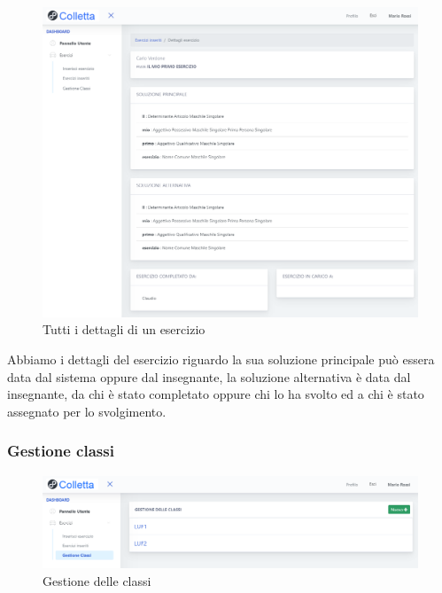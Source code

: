 \begin{figure}[H]
            	\centering
        		\includegraphics[width=17cm]{sez/img/insegnante/detagliesercizio.PNG} 
            	\caption{Tutti i dettagli di un esercizio}\label{fig:1}
        	\end{figure}     	
        	Abbiamo i dettagli del esercizio riguardo la sua soluzione principale può essera data dal sistema oppure dal insegnante, la soluzione alternativa è data dal insegnante, da chi è stato completato oppure chi lo ha svolto ed a chi è stato assegnato per lo svolgimento. 
        	
\newpage
        \subsubsection{Gestione classi}   
       
        \begin{figure}[H]
            	\centering
        		\includegraphics[width=17cm]{sez/img/insegnante/elencoclassi.PNG} 
            	\caption{Gestione delle classi}\label{fig:1}
        	\end{figure}          	
        	   

